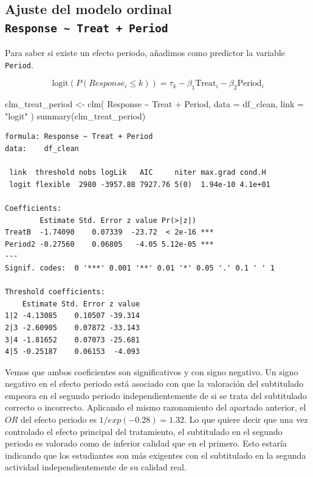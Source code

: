 \documentclass[
  12pt,
  a4paper,
  extrafontsizes,
  onecolumn,
  openright]{memoir}
\newenvironment{Shaded}{\begin{snugshade}}{\end{snugshade}}
\newcommand{\AttributeTok}[1]{\textcolor[rgb]{0.40,0.45,0.13}{#1}}
\newcommand{\FunctionTok}[1]{\textcolor[rgb]{0.28,0.35,0.67}{#1}}
\newcommand{\NormalTok}[1]{\textcolor[rgb]{0.00,0.23,0.31}{#1}}
\newcommand{\OtherTok}[1]{\textcolor[rgb]{0.00,0.23,0.31}{#1}}
\newcommand{\SpecialCharTok}[1]{\textcolor[rgb]{0.37,0.37,0.37}{#1}}
\newcommand{\StringTok}[1]{\textcolor[rgb]{0.13,0.47,0.30}{#1}}
\begin{document}
\hypertarget{ajuste-del-modelo-ordinal-response-treat-period}{%
\subsection{\texorpdfstring{Ajuste del modelo ordinal
\texttt{Response\ \textasciitilde{}\ Treat\ +\ Period}}{Ajuste del modelo ordinal Response \textasciitilde{} Treat + Period}}\label{ajuste-del-modelo-ordinal-response-treat-period}}

Para saber si existe un efecto periodo, añadimos como predictor la
variable \texttt{Period}.

\[
\text{logit}(P(Response_i \leq k)) = \tau_k - \beta_1 \text{Treat}_i - \beta_2 \text{Period}_i
\]

\scriptsize

\begin{Shaded}
\begin{Highlighting}[]
\NormalTok{clm\_treat\_period }\OtherTok{\textless{}{-}}
    \FunctionTok{clm}\NormalTok{(}
\NormalTok{        Response }\SpecialCharTok{\textasciitilde{}}\NormalTok{ Treat }\SpecialCharTok{+}\NormalTok{ Period,}
        \AttributeTok{data =}\NormalTok{ df\_clean, }\AttributeTok{link =} \StringTok{"logit"}
\NormalTok{    )}
\FunctionTok{summary}\NormalTok{(clm\_treat\_period)}
\end{Highlighting}
\end{Shaded}

\begin{verbatim}
formula: Response ~ Treat + Period
data:    df_clean

 link  threshold nobs logLik   AIC     niter max.grad cond.H 
 logit flexible  2980 -3957.88 7927.76 5(0)  1.94e-10 4.1e+01

Coefficients:
        Estimate Std. Error z value Pr(>|z|)    
TreatB  -1.74090    0.07339  -23.72  < 2e-16 ***
Period2 -0.27560    0.06805   -4.05 5.12e-05 ***
---
Signif. codes:  0 '***' 0.001 '**' 0.01 '*' 0.05 '.' 0.1 ' ' 1

Threshold coefficients:
    Estimate Std. Error z value
1|2 -4.13085    0.10507 -39.314
2|3 -2.60905    0.07872 -33.143
3|4 -1.81652    0.07073 -25.681
4|5 -0.25187    0.06153  -4.093
\end{verbatim}

\normalsize

Vemos que ambos coeficientes son significativos y con signo negativo. Un
signo negativo en el efecto periodo está asociado con que la valoración
del subtitulado empeora en el segundo periodo independientemente de si
se trata del subtitulado correcto o incorrecto. Aplicando el mismo
razonamiento del apartado anterior, el \(OR\) del efecto periodo es
\(1/exp(-0.28) = 1.32\). Lo que quiere decir que una vez controlado el
efecto principal del tratamiento, el subtitulado en el segundo periodo
es valorado como de inferior calidad que en el primero. Esto estaría
indicando que los estudiantes son más exigentes con el subtitulado en la
segunda actividad independientemente de su calidad real.
\end{document}
